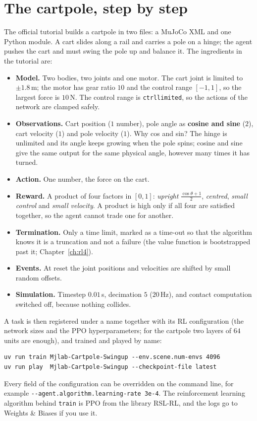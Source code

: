 \section*{The cartpole, step by step}
The official tutorial builds a cartpole in two files: a MuJoCo XML and one Python module. A cart slides along a rail and carries a pole on a hinge; the agent pushes the cart and must swing the pole up and balance it. The ingredients in the tutorial are:
\begin{itemize}[nosep]
 \item \textbf{Model.} Two bodies, two joints and one motor. The cart joint is limited to $\pm1.8$\,m; the motor has gear ratio $10$ and the control range $[-1,1]$, so the largest force is $10$\,N. The control range is \texttt{ctrllimited}, so the actions of the network are clamped safely.
 \item \textbf{Observations.} Cart position ($1$ number), pole angle as \textbf{cosine and sine} ($2$), cart velocity ($1$) and pole velocity ($1$). Why cos and sin? The hinge is unlimited and its angle keeps growing when the pole spins; cosine and sine give the same output for the same physical angle, however many times it has turned.
 \item \textbf{Action.} One number, the force on the cart.
 \item \textbf{Reward.} A product of four factors in $[0,1]$: \emph{upright} $\tfrac{\cos\theta+1}{2}$, \emph{centred}, \emph{small control} and \emph{small velocity}. A product is high only if all four are satisfied together, so the agent cannot trade one for another.
 \item \textbf{Termination.} Only a time limit, marked as a time-out so that the algorithm knows it is a truncation and not a failure (the value function is bootstrapped past it; Chapter~\ref{ch:rl4}).
 \item \textbf{Events.} At reset the joint positions and velocities are shifted by small random offsets.
 \item \textbf{Simulation.} Timestep $0.01$\,s, decimation $5$ ($20$\,Hz), and contact computation switched off, because nothing collides.
\end{itemize}
A task is then registered under a name together with its RL configuration (the network sizes and the PPO hyperparameters; for the cartpole two layers of $64$ units are enough), and trained and played by name:
\begin{verbatim}
uv run train Mjlab-Cartpole-Swingup --env.scene.num-envs 4096
uv run play  Mjlab-Cartpole-Swingup --checkpoint-file latest
\end{verbatim}
Every field of the configuration can be overridden on the command line, for example \verb!--agent.algorithm.learning-rate 3e-4!. The reinforcement learning algorithm behind \verb!train! is PPO from the library RSL-RL, and the logs go to Weights \& Biases if you use it.


